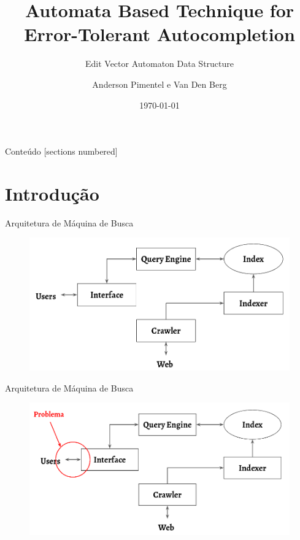 \documentclass[11pt]{beamer}
\title{Automata Based Technique for Error-Tolerant Autocompletion}
\subtitle{Edit Vector Automaton Data Structure}
\date{\today}
\author{Anderson Pimentel e Van Den Berg}
\institute{Instituto de Computação (ICOMP) - UFAM}
\begin{document}
\maketitle

\begin{frame}{Conteúdo}
  [sections numbered]
  \tableofcontents[hideallsubsections]
\end{frame}

\section{Introdução}

\begin{frame}[fragile]{Arquitetura de Máquina de Busca}

    \begin{figure}
      \includegraphics[scale=0.32]{pictures/arquitetura_mb.png}
      \centering
    \end{figure}

\end{frame}

\begin{frame}[fragile]{Arquitetura de Máquina de Busca}

    \begin{figure}
      \includegraphics[scale=0.32]{pictures/problema_arquitetura_mb_.png}
      \centering
    \end{figure}
 
\end{frame}
\end{document}
